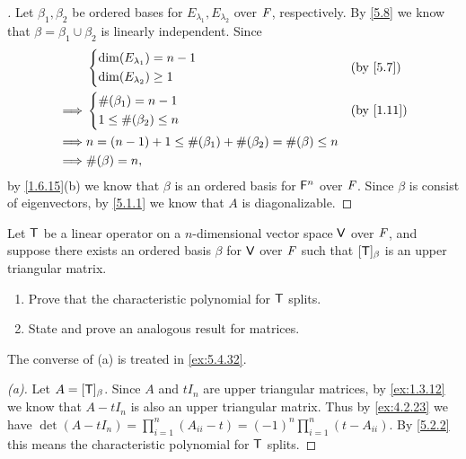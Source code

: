\begin{proof}[]
  Let \(\beta_1, \beta_2\) be ordered bases for \(E_{\lambda_1}, E_{\lambda_2}\) over \(\mathit{F}\), respectively.
  By \cref{5.8} we know that \(\beta = \beta_1 \cup \beta_2\) is linearly independent.
  Since
  \begin{align*}
             & \begin{dcases}
                 \dim(E_{\lambda_1}) = n - 1 \\
                 \dim(E_{\lambda_2}) \geq 1
               \end{dcases}                                    &  & \by{5.7}       \\
    \implies & \begin{dcases}
                 \#(\beta_1) = n - 1 \\
                 1 \leq \#(\beta_2) \leq n
               \end{dcases}                                         &  & \by{1.11} \\
    \implies & n = (n - 1) + 1 \leq \#(\beta_1) + \#(\beta_2) = \#(\beta) \leq n   \\
    \implies & \#(\beta) = n,
  \end{align*}
  by \cref{1.6.15}(b) we know that \(\beta\) is an ordered basis for \(\mathsf{F}^n\) over \(\mathit{F}\).
  Since \(\beta\) is consist of eigenvectors, by \cref{5.1.1} we know that \(A\) is diagonalizable.
\end{proof}

\begin{ex}\label{ex:5.2.9}
  Let \(\mathsf{T}\) be a linear operator on a \(n\)-dimensional vector space \(\mathsf{V}\) over \(\mathit{F}\), and suppose there exists an ordered basis \(\beta\) for \(\mathsf{V}\) over \(\mathit{F}\) such that \([\mathsf{T}]_{\beta}\) is an upper triangular matrix.
  \begin{enumerate}
    \item Prove that the characteristic polynomial for \(\mathsf{T}\) splits.
    \item State and prove an analogous result for matrices.
  \end{enumerate}
  The converse of (a) is treated in \cref{ex:5.4.32}.
\end{ex}

\begin{proof}[(a)]
  Let \(A = [\mathsf{T}]_{\beta}\).
  Since \(A\) and \(t I_n\) are upper triangular matrices, by \cref{ex:1.3.12} we know that \(A - t I_n\) is also an upper triangular matrix.
  Thus by \cref{ex:4.2.23} we have \(\det(A - t I_n) = \prod_{i = 1}^n (A_{i i} - t) = (-1)^n \prod_{i = 1}^n (t - A_{i i})\).
  By \cref{5.2.2} this means the characteristic polynomial for \(\mathsf{T}\) splits.
\end{proof}

